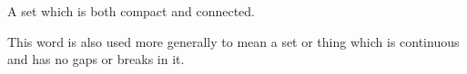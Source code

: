 A set which is both compact and connected.
\par
This word is also used more generally to mean a set or thing
which is continuous and has no gaps or breaks in it.